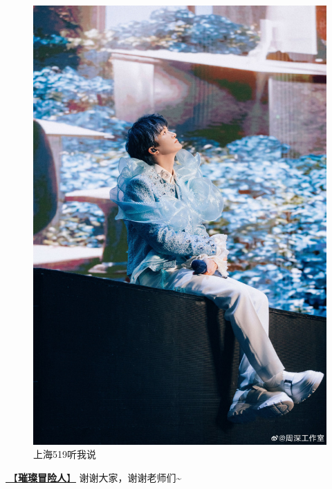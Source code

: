 \documentclass[]{ctexbook}
\begin{document}
\begin{figure}

{\centering \includegraphics[width=350pt]{img/shanghai20240519/001} 

}

\caption{上海519听我说}\label{fig:unnamed-chunk-37}
\end{figure}

\hyperref[adventurers]{🎵【\textbf{璀璨冒险人}】} 谢谢大家，谢谢老师们\textasciitilde{}
\end{document}
